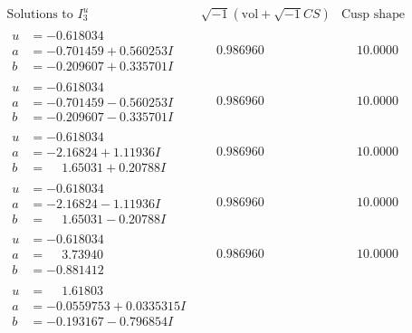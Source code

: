 \documentclass[1p]{elsarticle_modified}
\theoremstyle{definition}
\newcommand{\I}{\sqrt{-1}}
\begin{document}
$$\begin{array}{c|c|c}  
\text{Solutions to }I^u_{3}& \I (\text{vol} + \sqrt{-1}CS) & \text{Cusp shape}\\
 \hline 
\begin{aligned}
u &= -0.618034\phantom{ +0.000000I} \\
a &= -0.701459 + 0.560253 I \\
b &= -0.209607 + 0.335701 I\end{aligned}
 & \phantom{-}0.986960\phantom{ +0.000000I} & \phantom{-}10.0000\phantom{ +0.000000I} \\ \hline\begin{aligned}
u &= -0.618034\phantom{ +0.000000I} \\
a &= -0.701459 - 0.560253 I \\
b &= -0.209607 - 0.335701 I\end{aligned}
 & \phantom{-}0.986960\phantom{ +0.000000I} & \phantom{-}10.0000\phantom{ +0.000000I} \\ \hline\begin{aligned}
u &= -0.618034\phantom{ +0.000000I} \\
a &= -2.16824 + 1.11936 I \\
b &= \phantom{-}1.65031 + 0.20788 I\end{aligned}
 & \phantom{-}0.986960\phantom{ +0.000000I} & \phantom{-}10.0000\phantom{ +0.000000I} \\ \hline\begin{aligned}
u &= -0.618034\phantom{ +0.000000I} \\
a &= -2.16824 - 1.11936 I \\
b &= \phantom{-}1.65031 - 0.20788 I\end{aligned}
 & \phantom{-}0.986960\phantom{ +0.000000I} & \phantom{-}10.0000\phantom{ +0.000000I} \\ \hline\begin{aligned}
u &= -0.618034\phantom{ +0.000000I} \\
a &= \phantom{-}3.73940\phantom{ +0.000000I} \\
b &= -0.881412\phantom{ +0.000000I}\end{aligned}
 & \phantom{-}0.986960\phantom{ +0.000000I} & \phantom{-}10.0000\phantom{ +0.000000I} \\ \hline\begin{aligned}
u &= \phantom{-}1.61803\phantom{ +0.000000I} \\
a &= -0.0559753 + 0.0335315 I \\
b &= -0.193167 - 0.796854 I\end{aligned}

\end{array}$$
\end{document}
